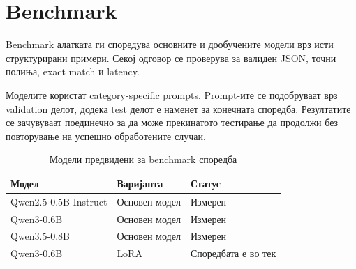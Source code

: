 \chapter{Benchmark}

Benchmark алатката ги споредува основните и дообучените модели врз исти структурирани примери.
Секој одговор се проверува за валиден JSON, точни полиња, exact match и latency.

Моделите користат category-specific prompts.
Prompt-ите се подобруваат врз validation делот, додека test делот е наменет за конечната споредба.
Резултатите се зачувуваат поединечно за да може прекинатото тестирање да продолжи без повторување на успешно обработените случаи.

\begin{table}[ht]
  \centering
  \small
  \begin{tabular}{lll}
    \toprule
    Модел & Варијанта & Статус \\
    \midrule
    Qwen2.5-0.5B-Instruct & Основен модел & Измерен \\
    Qwen3-0.6B & Основен модел & Измерен \\
    Qwen3.5-0.8B & Основен модел & Измерен \\
    Qwen3-0.6B & LoRA & Споредбата е во тек \\
    \bottomrule
  \end{tabular}
  \caption{Модели предвидени за benchmark споредба}
\end{table}
